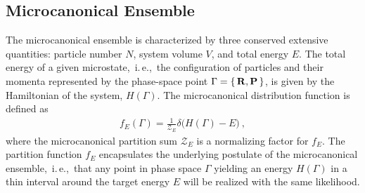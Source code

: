 \subsection{Microcanonical Ensemble}
The microcanonical ensemble is characterized by three conserved extensive quantities: particle number $N$, system volume $V$, and total energy $E$. The total energy of a given microstate,~i.\,e.,~the configuration of particles and their momenta represented by the phase-space point $\Gamma = \set{{\bf R}, {\bf P}}$, is given by the Hamiltonian of the system, $H (\Gamma)$. 
The microcanonical distribution function is defined as
\begin{align}
f_E (\Gamma) = \frac{1}{\mathcal{Z}_E} \delta {\bm (} H (\Gamma) - E {\bm )}~,
\end{align}
where the microcanonical partition sum $\mathcal{Z}_E$ is a normalizing factor for $f_E$. The partition function $f_E$ encapsulates the underlying postulate of the microcanonical ensemble,~i.\,e.,~that any point in phase space $\Gamma$ yielding an energy $H (\Gamma)$ in a thin interval around the target energy $E$ 
will be realized with the same likelihood.

